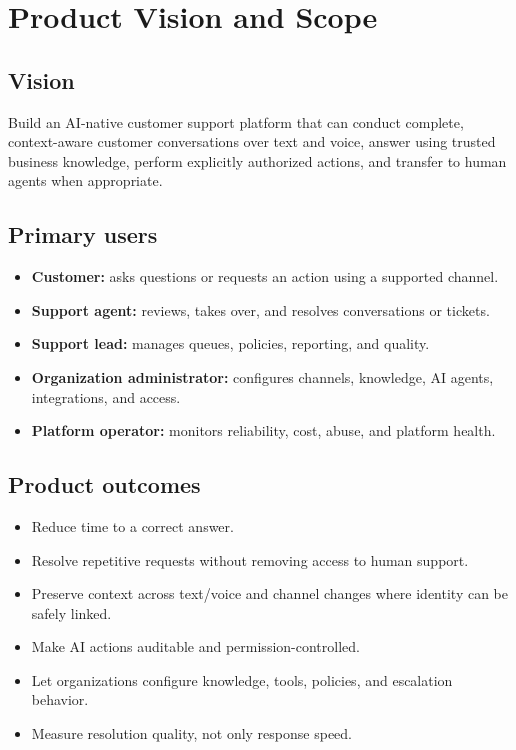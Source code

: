 \chapter{Product Vision and Scope}

\section{Vision}

Build an AI-native customer support platform that can conduct complete, context-aware customer conversations over text and voice, answer using trusted business knowledge, perform explicitly authorized actions, and transfer to human agents when appropriate.

\section{Primary users}

\begin{itemize}
\item \textbf{Customer:} asks questions or requests an action using a supported channel.
\item \textbf{Support agent:} reviews, takes over, and resolves conversations or tickets.
\item \textbf{Support lead:} manages queues, policies, reporting, and quality.
\item \textbf{Organization administrator:} configures channels, knowledge, AI agents, integrations, and access.
\item \textbf{Platform operator:} monitors reliability, cost, abuse, and platform health.
\end{itemize}
\section{Product outcomes}

\begin{itemize}
\item Reduce time to a correct answer.
\item Resolve repetitive requests without removing access to human support.
\item Preserve context across text/voice and channel changes where identity can be safely linked.
\item Make AI actions auditable and permission-controlled.
\item Let organizations configure knowledge, tools, policies, and escalation behavior.
\item Measure resolution quality, not only response speed.
\end{itemize}
